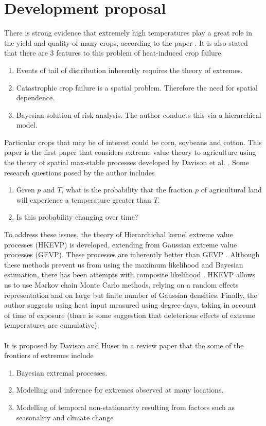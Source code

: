 \documentclass[12pt]{article}
\theoremstyle{definition}
\theoremstyle{remark}
\theoremstyle{definition}
\theoremstyle{plain}
\begin{document}
\section{Development proposal}
There is strong evidence that extremely high temperatures play a great role in the yield and quality of many crops, according to the paper \cite{Reich2012}. It is also stated that there are 3 features to this problem of heat-induced crop failure:
\begin{enumerate}
    \item Events of tail of distribution inherently requires the theory of extremes.
    \item Catastrophic crop failure is a spatial problem. Therefore the need for spatial dependence.
    \item Bayesian solution of risk analysis. The author conducts this via a hierarchical model.
\end{enumerate}
Particular crops that may be of interest could be corn, soybeans and cotton. This paper is the first paper that considers extreme value theory to agriculture using the theory of spatial max-stable processes developed by Davison et al. \cite{Davison2012}. Some research questions posed by the author includes
\begin{enumerate}
    \item Given $p$ and $T$, what is the probability that the fraction $p$ of agricultural land will experience a temperature greater than $T$.
    \item Is this probability changing over time?
\end{enumerate}
To address these issues, the theory of Hierarchichal kernel extreme value processes (HKEVP) is developed, extending from Gaussian extreme value processes (GEVP). These processes are inherently better than GEVP \cite{Davison2013}. Although these methods prevent us from using the maximum likelihood and Bayesian estimation, there has been attempts with composite likelihood \cite{Shaby2012} \cite{Padoan2010}. HKEVP allows us to use Markov chain Monte Carlo methods, relying on a random effects representation and on large but finite number of Gaussian densities. Finally, the author suggests using heat input measured using degree-days, taking in account of time of exposure (there is some suggestion that deleterious effects of extreme temperatures are cumulative). \\ \\
It is proposed by Davison and Huser \cite{Davison2015} in a review paper that the some of the frontiers of extremes include
\begin{enumerate}
    \item Bayesian extremal processes.
    \item Modelling and inference for extremes observed at many locations.
    \item Modelling of temporal non-stationarity resulting from factors such as seasonality and climate change
\end{enumerate}
\end{document}
